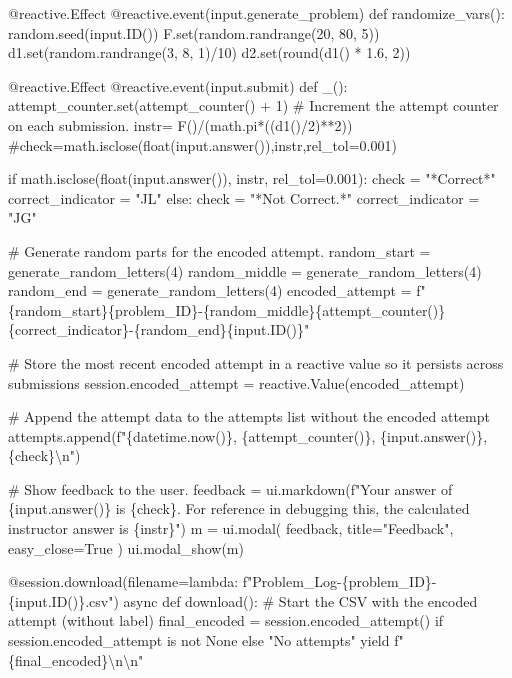 \documentclass[
  letterpaper,
  DIV=11,
  numbers=noendperiod]{scrreprt}
\newenvironment{Shaded}{\begin{snugshade}}{\end{snugshade}}
\newcommand{\NormalTok}[1]{\textcolor[rgb]{0.00,0.23,0.31}{#1}}
\begin{document}
\begin{Shaded}
\begin{Highlighting}[]
\NormalTok{    @reactive.Effect}
\NormalTok{    @reactive.event(input.generate\_problem)}
\NormalTok{    def randomize\_vars():}
\NormalTok{        random.seed(input.ID())}
\NormalTok{        F.set(random.randrange(20, 80, 5))}
\NormalTok{        d1.set(random.randrange(3, 8, 1)/10)}
\NormalTok{        d2.set(round(d1() * 1.6, 2))}
        
 
\NormalTok{    @reactive.Effect}
\NormalTok{    @reactive.event(input.submit)}
\NormalTok{    def \_():}
\NormalTok{        attempt\_counter.set(attempt\_counter() + 1)  \# Increment the attempt counter on each submission.}
\NormalTok{        instr= F()/(math.pi*((d1()/2)**2))}
\NormalTok{        \#check=math.isclose(float(input.answer()),instr,rel\_tol=0.001)}
        
\NormalTok{        if math.isclose(float(input.answer()), instr, rel\_tol=0.001):}
\NormalTok{            check = "*Correct*"}
\NormalTok{            correct\_indicator = "JL"}
\NormalTok{        else:}
\NormalTok{            check = "*Not Correct.*"}
\NormalTok{            correct\_indicator = "JG"}

\NormalTok{        \# Generate random parts for the encoded attempt.}
\NormalTok{        random\_start = generate\_random\_letters(4)}
\NormalTok{        random\_middle = generate\_random\_letters(4)}
\NormalTok{        random\_end = generate\_random\_letters(4)}
\NormalTok{        encoded\_attempt = f"\{random\_start\}\{problem\_ID\}{-}\{random\_middle\}\{attempt\_counter()\}\{correct\_indicator\}{-}\{random\_end\}\{input.ID()\}"}

\NormalTok{        \# Store the most recent encoded attempt in a reactive value so it persists across submissions}
\NormalTok{        session.encoded\_attempt = reactive.Value(encoded\_attempt)}

\NormalTok{        \# Append the attempt data to the attempts list without the encoded attempt}
\NormalTok{        attempts.append(f"\{datetime.now()\}, \{attempt\_counter()\}, \{input.answer()\}, \{check\}\textbackslash{}n")}

\NormalTok{        \# Show feedback to the user.}
\NormalTok{        feedback = ui.markdown(f"Your answer of \{input.answer()\} is \{check\}. For reference in debugging this, the calculated instructor answer is \{instr\}")}
\NormalTok{        m = ui.modal(}
\NormalTok{            feedback,}
\NormalTok{            title="Feedback",}
\NormalTok{            easy\_close=True}
\NormalTok{        )}
\NormalTok{        ui.modal\_show(m)}

\NormalTok{    @session.download(filename=lambda: f"Problem\_Log{-}\{problem\_ID\}{-}\{input.ID()\}.csv")}
\NormalTok{    async def download():}
\NormalTok{        \# Start the CSV with the encoded attempt (without label)}
\NormalTok{        final\_encoded = session.encoded\_attempt() if session.encoded\_attempt is not None else "No attempts"}
\NormalTok{        yield f"\{final\_encoded\}\textbackslash{}n\textbackslash{}n"}
        

\end{Highlighting}
\end{Shaded}
\end{document}
